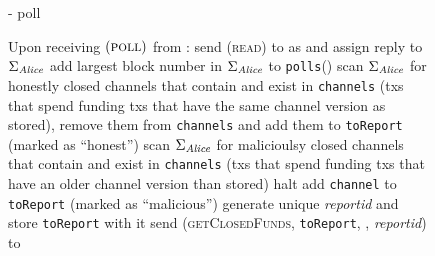   \begin{figure}[H]
    \begin{systembox}{\fpaynet - poll}
      \begin{algorithmic}[1]
        \State Upon receiving $\left(\textsc{poll}\right)$ from \alice:
        \Indent
          \State send (\textsc{read}) to \ledger{} as \alice{} and assign reply
          to $\Sigma_{\mathit{Alice}}$
          \State add largest block number in $\Sigma_{\mathit{Alice}}$ to
          \texttt{polls}(\alice)
          \State scan $\Sigma_{\mathit{Alice}}$ for honestly closed channels that
          contain \alice{} and exist in \texttt{channels} (txs that spend
          funding txs that have the same channel version as stored), remove them
          from \texttt{channels} and add them to \texttt{toReport} (marked as
          ``honest'')
          \State scan $\Sigma_{\mathit{Alice}}$ for malicioulsy closed channels that
          contain \alice{} and exist in \texttt{channels} (txs that spend
          funding txs that have an older channel version than stored)
              \State halt 
            \EndIf
            \State add \texttt{channel} to \texttt{toReport} (marked as
            ``malicious'')
          \EndFor
          \State generate unique \textit{reportid} and store \texttt{toReport}
          with it
          \State send (\textsc{getClosedFunds}, \texttt{toReport}, \alice,
          \textit{reportid}) to \simulator
        \EndIndent
        \Statex


\end{algorithmic}
\end{systembox}
\end{figure}
